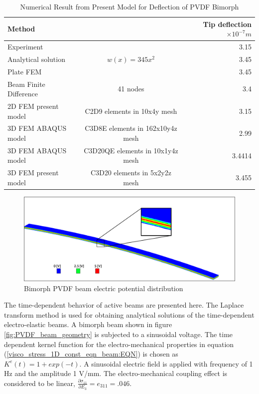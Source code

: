 \begin{table}
\caption{Numerical Result from Present Model for Deflection of PVDF Bimorph}
\centering
\begin{tabular}{|l|c|r|} \hline
Method  &   &  Tip deflection $\times 10^{-7} m$ \\ \hline
Experiment \cite{tzou1991distributed} &  & 3.15 \\ \hline
Analytical solution & $w(x)=345 x^2$ & 3.45\\ \hline
Plate FEM \cite{franco2000modelling} &  & 3.45 \\ \hline
Beam Finite Difference & 41 nodes & 3.4 \\  \hline
2D FEM present model  & C2D9 elements in 10x4y mesh &3.15 \\  \hline
3D FEM ABAQUS model  & C3D8E elements in 162x10y4z mesh & 2.99\\ \hline
3D FEM ABAQUS model  & C3D20QE elements in 10x1y4z mesh & 3.4414\\ \hline
3D FEM present model  & C3D20 elements in 5x2y2z mesh & 3.455 \\ \hline
\end{tabular}
\label{table:PVDF_bimorph_numerical_result_static}
\end{table}

\begin{figure}
\centering
\includegraphics[trim = 00mm 0mm 00mm 0mm, clip=true,width=7.0in]{./chap_4_structural_analyses/pdf_beam/PVDF_beam_geometry_epot_distribution.png}
\caption{Bimorph PVDF beam electric potential distribution}
\label{fig:PVDF_beam_geometry_epot_distribution}
\end{figure}


The time-dependent behavior of active beams are presented here.  
The Laplace transform method is used for obtaining analytical solutions of the time-dependent electro-elastic beams.
A bimorph beam shown in figure \ref{fig:PVDF_beam_geometry} is subjected to a sinusoidal voltage.
The time dependent kernel function for the electro-mechanical properties in equation (\ref{visco_stress_1D_const_eqn_beam:EQN}) is chosen as $K^e (t)=1+exp(-t)$.
A sinusoidal electric field is applied with frequency of 1 Hz and the amplitude 1 V/mm.
The electro-mechanical coupling effect is considered to be linear, $\frac{\partial \sigma_{11}}{\partial E_{3}}=e_{311}=.046$.

